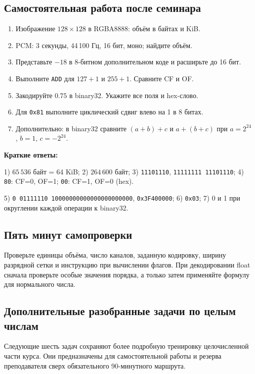 \subsection*{Самостоятельная работа после семинара}
\begin{enumerate}
    \item Изображение $128\times128$ в RGBA8888: объём в байтах и KiB.
    \item PCM: 3 секунды, 44\,100 Гц, 16 бит, моно; найдите объём.
    \item Представьте $-18$ в 8-битном дополнительном коде и расширьте до 16 бит.
    \item Выполните \texttt{ADD} для $127+1$ и $255+1$. Сравните CF и OF.
    \item Закодируйте $0.75$ в binary32. Укажите все поля и hex-слово.
    \item Для \texttt{0x81} выполните циклический сдвиг влево на 1 в 8 битах.
    \item Дополнительно: в binary32 сравните $(a+b)+c$ и $a+(b+c)$
    при $a=2^{24}$, $b=1$, $c=-2^{24}$.
\end{enumerate}
\textbf{Краткие ответы:}\par
1) $65\,536$ байт = 64 KiB;
2) $264\,600$ байт;
3) \texttt{11101110}, \texttt{11111111 11101110};
4) \texttt{80}: CF=0, OF=1; \texttt{00}: CF=1, OF=0 (hex).\par
5) \texttt{0 01111110 10000000000000000000000}, \texttt{0x3F400000};
6) \texttt{0x03}; 7) 0 и 1 при округлении каждой операции к binary32.

\subsection*{Пять минут самопроверки}
Проверьте единицы объёма, число каналов, заданную кодировку,
ширину разрядной сетки и инструкцию при вычислении флагов.
При декодировании float сначала проверьте особые значения порядка,
а только затем применяйте формулу для нормального числа.

\subsection*{Дополнительные разобранные задачи по целым числам}
Следующие шесть задач сохраняют более подробную тренировку целочисленной
части курса. Они предназначены для самостоятельной работы и резерва
преподавателя сверх обязательного 90-минутного маршрута.
